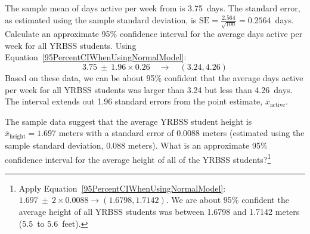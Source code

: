 \begin{spacing}{1.5}

\begin{example}{The sample mean of days active per week from  is 3.75~days. The standard error, as estimated using the sample standard deviation, is $\text{SE}=\frac{2.564}{\sqrt{100}} = 0.2564$~days. Calculate an approximate 95\% confidence interval for the average days active per week for all YRBSS students.}
Using Equation~\ref{95PercentCIWhenUsingNormalModel}:
\[3.75\ \pm\ 1.96 \times  0.26 \quad \rightarrow \quad (3.24, 4.26)\]
Based on these data, we can be about 95\% confident that the average days active per week for all YRBSS students was larger than 3.24 but less than 4.26~days. The interval extends out 1.96 standard errors from the point estimate, $\overline{x}_{\text{active}}$.
\end{example}

\begin{exercise} \label{95CIExerciseForAgeOfYrbssSamp1}
The sample data suggest that the average YRBSS student height is $\overline{x}_{\text{height}} = 1.697$ meters with a standard error of 0.0088 meters (estimated using the sample standard deviation, 0.088 meters). What is an approximate 95\% confidence interval for the average height of all of the YRBSS students?\footnote{Apply Equation~\ref{95PercentCIWhenUsingNormalModel}: $1.697 \ \pm \ 2\times 0.0088 \rightarrow (1.6798, 1.7142)$.  We are about 95\% confident the average height of all YRBSS students was between 1.6798 and 1.7142 meters (5.5~to 5.6~feet).}
\end{exercise}

\end{spacing}
